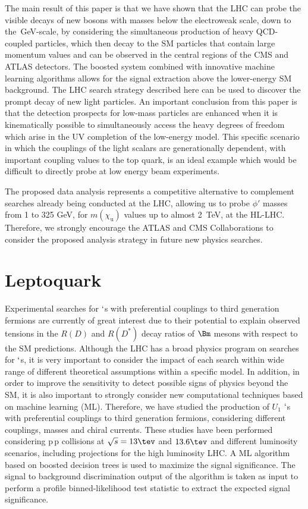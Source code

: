 The main result of this paper is that we have shown that the LHC can probe the visible decays of new bosons with masses below the electroweak scale, down to the~\textrm{GeV}-scale, by considering the simultaneous production of heavy QCD-coupled particles, which then decay to the SM particles that contain large momentum values and can be observed in the central regions of the CMS and ATLAS detectors. The boosted system combined with innovative machine learning algorithms allows for the signal extraction above the lower-energy SM background. The LHC search strategy described here can be used to discover the prompt decay of new light particles.  An important conclusion from this paper is that the detection prospects for low-mass particles are enhanced when it is kinematically possible to simultaneously access the heavy degrees of freedom which arise in the UV completion of the low-energy model.  This specific scenario in which the couplings of the light scalars are generationally dependent, with important coupling values to the top quark, is an ideal example which would be difficult to directly probe at low energy beam experiments.

The proposed data analysis represents a competitive alternative 
to complement searches already being conducted at the LHC, allowing us to probe $\phi'$ masses from 1 to 325 \textrm{GeV}, for $m(\chi_{\mathrm{u}})$ values up to almost 2~\textrm{TeV}, at the HL-LHC. Therefore, we strongly encourage the ATLAS and CMS Collaborations to consider the proposed analysis strategy in future new physics searches. 


\section{Leptoquark}


Experimental searches for $\lq$s with preferential couplings to third generation fermions are currently of great interest due to their potential to explain observed tensions in the $R(D)$ and $R(D^{*})$ decay ratios of $\Bm$ mesons with respect to the SM predictions. Although the LHC has a broad physics program on searches for $\lq$s, it is very important to consider the impact of each search within wide range of different theoretical assumptions within a specific model. In addition, in order to improve the sensitivity to detect possible signs of physics beyond the SM, it is also important to strongly consider new computational techniques based on machine learning (ML). Therefore, we have studied the production of $U_1$ $\lq$s with preferential couplings to third generation fermions, considering different couplings, masses and chiral currents. These studies have been performed considering $\mathrm{p}\,\mathrm{p}$ collisions at $\sqrt{s} = 13\tev$ and $13.6\tev$ and different luminosity scenarios, including projections for the high luminosity LHC. A ML algorithm based on boosted decision trees is used to maximize the signal significance. The signal to background discrimination output of the algorithm is taken as input to perform a profile binned-likelihood test statistic to extract the expected signal significance. 

